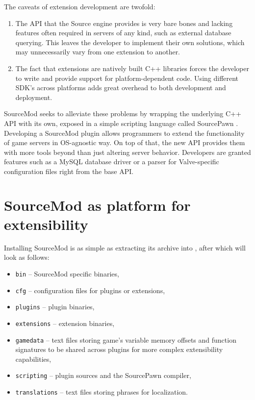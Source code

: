 The caveats of extension development are twofold:
\begin{enumerate}
\item
The API that the Source engine provides is very bare bones and lacking features often required in servers of any kind, such as external database querying.
This leaves the developer to implement their own solutions, which may unnecessarily vary from one extension to another.
\item
The fact that extensions are natively built C++ libraries forces the developer to write and provide support for platform-dependent code.
Using different SDK's across platforms adds great overhead to both development and deployment.
\end{enumerate}
SourceMod seeks to alleviate these problems by wrapping the underlying C++ API with its own, exposed in a simple scripting language called SourcePawn \cite{alliedmodders-sourcepawn}.
Developing a SourceMod plugin allows programmers to extend the functionality of game servers in OS-agnostic way.
On top of that, the new API provides them with more tools beyond than just altering server behavior.
Developers are granted features such as a MySQL database driver or a parser for Valve-specific configuration files right from the base API.

\section{SourceMod as platform for extensibility}

Installing SourceMod is as simple as extracting its archive into , after which  will look as follows:
\begin{itemize}
    \item \verb|bin| -- SourceMod specific binaries,
    \item \verb|cfg| -- configuration files for plugins or extensions,
    \item \verb|plugins| -- plugin binaries,
    \item \verb|extensions| -- extension binaries,
    \item \verb|gamedata| -- text files storing game's variable memory offsets and function signatures to be shared across plugins for more complex extensibility capabilities,
    \item \verb|scripting| -- plugin sources and the SourcePawn compiler,
    \item \verb|translations| -- text files storing phrases for localization.
\end{itemize}

